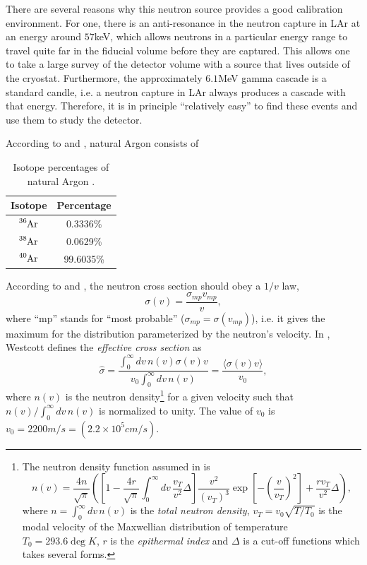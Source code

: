 \documentclass[8pt]{refart}
\begin{document}
There are several reasons why this neutron source provides a good calibration environment.  For one, there is an anti-resonance in the neutron capture in LAr at an energy around $57$keV, which allows neutrons in a particular energy range to travel quite far in the fiducial volume before they are captured.  This allows one to take a large survey of the detector volume with a source that lives outside of the cryostat.  Furthermore, the approximately $6.1$MeV gamma cascade is a standard candle, i.e. a neutron capture in LAr always produces a cascade with that energy.  Therefore, it is in principle ``relatively easy'' to find these events and use them to study the detector.

\label{naturalargon}
According to \cite{DANCE} and \cite{NUBASE2012}, natural Argon consists of 
\begin{table}[H]
    \centering
    \begin{tabular}{|c|c|}
    \hline
         Isotope &  Percentage\\
         \hline
         $\ce{^{36}\mathrm{Ar}}$ & 0.3336\%\\
         \hline
         $\ce{^{38}\mathrm{Ar}}$ & 0.0629\%\\
         \hline
         $\ce{^{40}\mathrm{Ar}}$ & 99.6035\%\\
         \hline
    \end{tabular}
    \caption{Isotope percentages of natural Argon \cite{DANCE,NUBASE2012}.}
    \label{tab:my_label}
\end{table}
According to \cite{DANCE} and \cite{Westcott}, the neutron cross section should obey a $1/v$ law,
\begin{equation}
    \sigma(v) = \frac{\sigma_{mp}v_{mp}}{v},
\end{equation}
where ``mp'' stands for ``most probable'' ($\sigma_{mp} = \sigma(v_{mp})$), i.e. it gives the maximum for the distribution parameterized by the neutron's velocity.  In \cite{Westcott}, Westcott defines the \textit{effective cross section} as
\begin{equation}
    \hat{\sigma} = \frac{\int_{0}^{\infty}dv\,n(v)\sigma(v)v}{v_0\int_{0}^{\infty}dv\,n(v)} = \frac{\langle \sigma(v) v\rangle}{v_0},
\end{equation}
where $n(v)$ is the neutron density\footnote{The neutron density function assumed in \cite{Westcott} is \begin{equation}n(v) = \frac{4n}{\sqrt{\pi}}\left(\left[1 - \frac{4r}{\sqrt{\pi}}\int_0^{\infty}dv\,\frac{v_T}{v^2}\Delta\right]\frac{v^2}{(v_T)^3}\exp\left[-\left(\frac{v}{v_T}\right)^2\right] + \frac{rv_T}{v^2}\Delta\right),\end{equation} where $n = \int_0^{\infty}dv\, n(v)$ is the \textit{total neutron density}, $v_T = v_0\sqrt{T/T_0}$ is the modal velocity of the Maxwellian distribution of temperature $T_0 = 293.6\deg K$, $r$ is the \textit{epithermal index} and $\Delta$ is a cut-off functions which takes several forms.} for a given velocity such that $n(v)/\int_0^{\infty}dv\,n(v)$ is normalized to unity.  The value of $v_0$ is $v_0 = 2200 m/s = (2.2\times 10^5 cm/s)$.
\end{document}
